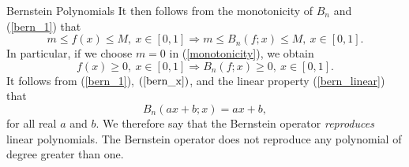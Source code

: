 \documentclass{beamer}
\begin{document}
\begin{frame}{Bernstein Polynomials}
    It then follows from the monotonicity of $B_n$ and (\ref{bern_1}) that
\begin{equation}
m \leq f(x) \leq M, \ x \in [0, 1] \Rightarrow m \leq B_n(f;x) \leq M, \ x \in [0, 1].
\label{monotonicity}
\end{equation}
In particular, if we choose $m=0$ in (\ref{monotonicity}), we obtain
\begin{equation}
  f(x) \geq 0, \ x \in [0, 1] \Rightarrow B_n(f;x) \geq 0, \ x \in [0, 1].
\end{equation}
It follows from (\ref{bern_1}), $(\ref{bern_x})$, and the linear property (\ref{bern_linear}) that
\begin{equation}
    B_n(ax+b;x) = ax + b,
\end{equation}
for all real $a$ and $b$. We therefore say that the Bernstein operator \textit{reproduces} linear polynomials. The Bernstein operator does not reproduce any polynomial of degree greater than one\cite{phillips2003interpolation}.
\end{frame}
\end{document}

